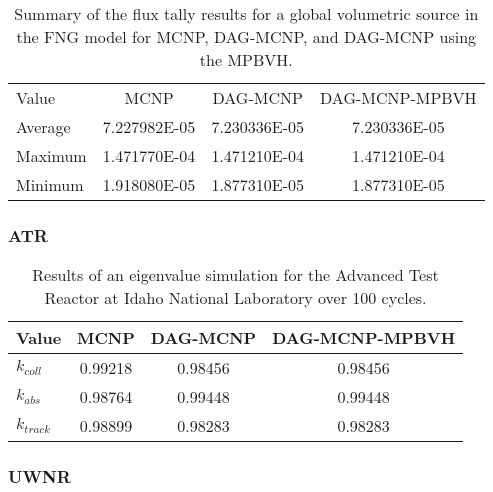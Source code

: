   \begin{table}[H]
    \small
    \begin{center}
      \begin{tabular}{lccc}
        \toprule
        Value & MCNP & DAG-MCNP & DAG-MCNP-MPBVH \\
        Average & 7.227982E-05 & 7.230336E-05 & 7.230336E-05 \\
        Maximum & 1.471770E-04 & 1.471210E-04 & 1.471210E-04 \\
        Minimum & 1.918080E-05 & 1.877310E-05 & 1.877310E-05 \\
      \end{tabular}
    \end{center}
    \caption[Flux tally results in FNG for various DAG-MCNP
      implementations.]{Summary of the flux tally results for a global
      volumetric source in the FNG model for MCNP, DAG-MCNP, and DAG-MCNP using
      the MPBVH.}
  \end{table}

  \subsubsection{ATR}

  \begin{table}
    \small
    \begin{center}
      \begin{tabular}{lccc}
        \toprule
        Value & MCNP & DAG-MCNP & DAG-MCNP-MPBVH \\
        \toprule
        $k_{coll}$  & 0.99218 & 0.98456 & 0.98456  \\
        $k_{abs}$   & 0.98764 & 0.99448 & 0.99448  \\
        $k_{track}$ & 0.98899 & 0.98283 & 0.98283  \\
        \bottomrule
      \end{tabular}
    \end{center}
    \caption[Results of eigenvalue simulations in ATR for various DAG-MCNP
      implementations.]{Results of an eigenvalue simulation for the Advanced
      Test Reactor at Idaho National Laboratory over 100 cycles.}
  \end{table}

  \subsubsection{UWNR}


